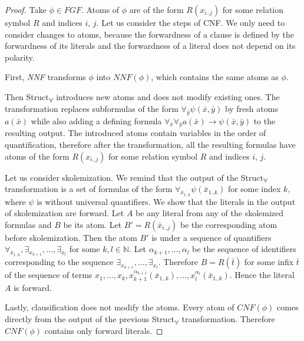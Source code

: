 \documentclass[english, shortabstract]{iithesis}
\theoremstyle{definition} \newtheorem{definition}{Definition}[chapter]
\theoremstyle{remark} \newtheorem{remark}[definition]{Observation}
\theoremstyle{plain} \newtheorem{theorem}[definition]{Theorem}
\theoremstyle{plain} \newtheorem{lemma}[definition]{Lemma}
\begin{document}
\begin{proof}
Take $\phi \in \mathit{FGF}$. Atoms of $\phi$ are of the form $R(x_{i..j})$ for some relation symbol $R$ and indices $i$, $j$.
Let us consider the steps of CNF. We only need to consider changes to atoms, 
because the forwardness of a clause is defined by the forwardness of its literals and the forwardness of a literal does not depend on its polarity.

First, \emph{NNF} transforms $\phi$ into $\mathit{NNF}(\phi)$, which contains the same atoms as $\phi$.

Then Struct\textsubscript{{$\forall$}} introduces new atoms and does not modify existing ones.
The transformation replaces subformulas of the form $\forall_{\bar{y}} \psi(\bar{x},\bar{y})$ 
by fresh atoms $a(\bar{x})$ while also adding a defining formula $\forall_{\bar{x}} \forall_{\bar{y}} a(\bar{x}) \rightarrow \psi(\bar{x},\bar{y})$ to the resulting output.
The introduced atoms contain variables in the order of quantification, therefore after the transformation, all the resulting formulas have atoms of the form $R(x_{i..j})$ for some relation symbol $R$ and indices $i$, $j$.

Let us consider skolemization. 
We remind that the output of the Struct\textsubscript{{$\forall$}} transformation is a set of formulas
of the form $\forall_{\bar{x}_{1..k}} \psi(\bar{x}_{1..k})$ for some index $k$, where $\psi$ is without universal quantifiers. 
We show that the literals in the output of skolemization are forward. 
Let $A$ be any literal from any of the skolemized formulas and $B$ be its atom. Let $B'=R(\bar{x}_{i..j})$ be the corresponding atom 
before skolemization. Then the atom $B'$ is under a sequence of quantifiers $\forall_{\bar{x}_{1..k}}, \exists_{x_{k+1}}, \dots, \exists_{x_{l}}$ for some $k,l \in \mathbb{N}$. 
Let $\alpha_{k+1}, \dots, \alpha_l$ be the sequence of identifiers corresponding to the sequence $\exists_{x_{k+1}}, \dots, \exists_{x_{l}}$.
Therefore $B=R(\bar{t})$ for some infix $\bar{t}$ of the sequence of terms $x_{1}, \dots, x_k, x^{\alpha_{k+1}}_{k+1}(\bar{x}_{1..k}), \dots, x^{\alpha_l}_{l}(\bar{x}_{1..k})$. 
Hence the literal $A$ is forward.

Lastly, clausification does not modify the atoms. 
Every atom of $\mathit{CNF}(\phi)$ comes directly from the output of the previous Struct\textsubscript{{$\forall$}} transformation.
Therefore $\mathit{CNF}(\phi)$ contains only forward literals.
\end{proof}
\end{document}
